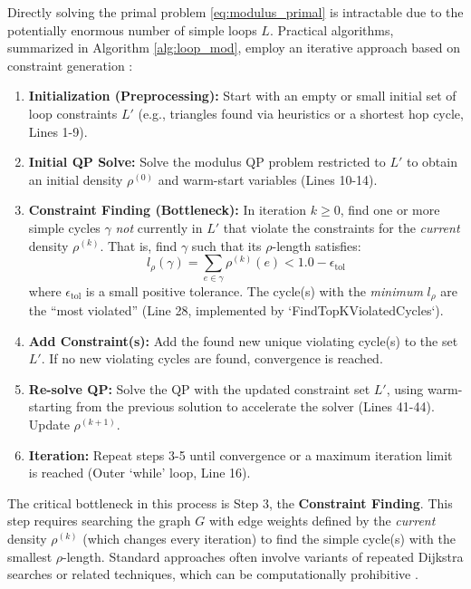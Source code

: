 \documentclass{article}
\begin{document}
Directly solving the primal problem \eqref{eq:modulus_primal} is intractable due to the potentially enormous number of simple loops $L$. Practical algorithms, summarized in Algorithm \ref{alg:loop_mod}, employ an iterative approach based on constraint generation \cite{shakeri2017network}:
\begin{enumerate}
    \item \textbf{Initialization (Preprocessing):} Start with an empty or small initial set of loop constraints $L'$ (e.g., triangles found via heuristics or a shortest hop cycle, Lines 1-9).
    \item \textbf{Initial QP Solve:} Solve the modulus QP problem restricted to $L'$ to obtain an initial density $\rho^{(0)}$ and warm-start variables (Lines 10-14).
    \item \textbf{Constraint Finding (Bottleneck):} In iteration $k \ge 0$, find one or more simple cycles $\gamma$ \textit{not} currently in $L'$ that violate the constraints for the \textit{current} density $\rho^{(k)}$. That is, find $\gamma$ such that its $\rho$-length satisfies:
    \begin{equation}
    \label{eq:rho_length_violation}
    l_\rho(\gamma) = \sum_{e \in \gamma} \rho^{(k)}(e) < 1.0 - \epsilon_{\text{tol}}
    \end{equation}
    where $\epsilon_{\text{tol}}$ is a small positive tolerance. The cycle(s) with the \textit{minimum} $l_\rho$ are the ``most violated'' (Line 28, implemented by `FindTopKViolatedCycles`).
    \item \textbf{Add Constraint(s):} Add the found new unique violating cycle(s) to the set $L'$. If no new violating cycles are found, convergence is reached.
    \item \textbf{Re-solve QP:} Solve the QP with the updated constraint set $L'$, using warm-starting from the previous solution to accelerate the solver (Lines 41-44). Update $\rho^{(k+1)}$.
    \item \textbf{Iteration:} Repeat steps 3-5 until convergence or a maximum iteration limit is reached (Outer `while' loop, Line 16).
\end{enumerate}
The critical bottleneck in this process is Step 3, the \textbf{Constraint Finding}. This step requires searching the graph $G$ with edge weights defined by the \textit{current} density $\rho^{(k)}$ (which changes every iteration) to find the simple cycle(s) with the smallest $\rho$-length. Standard approaches often involve variants of repeated Dijkstra searches or related techniques, which can be computationally prohibitive \cite{shakeri2017network}.
\end{document}
